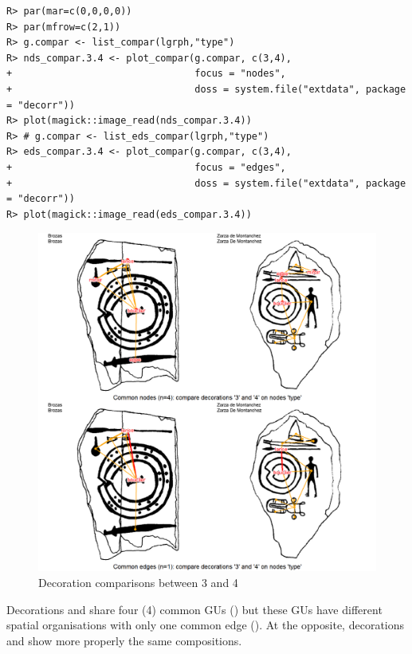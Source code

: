 \documentclass[article]{jss}\usepackage{knitr}
\begin{document}
\begin{kframe}
\begin{verbatim}
R> par(mar=c(0,0,0,0))
R> par(mfrow=c(2,1))
R> g.compar <- list_compar(lgrph,"type")
R> nds_compar.3.4 <- plot_compar(g.compar, c(3,4),
+                                focus = "nodes",
+                                doss = system.file("extdata", package = "decorr"))
R> plot(magick::image_read(nds_compar.3.4))
R> # g.compar <- list_eds_compar(lgrph,"type")
R> eds_compar.3.4 <- plot_compar(g.compar, c(3,4),
+                                focus = "edges",
+                                doss = system.file("extdata", package = "decorr"))
R> plot(magick::image_read(eds_compar.3.4))
\end{verbatim}
\end{kframe}\begin{figure}[H]

{\centering \includegraphics[width=\maxwidth]{figure/unnamed-chunk-11-1} 

}

\caption{\label{fig:figs}Decoration comparisons between 3 and 4}\label{fig:unnamed-chunk-11}
\end{figure}



Decorations  and  share four (4) common GUs () but  these GUs have different spatial organisations with only one common edge (). At the opposite, decorations  and  show more properly the same compositions.
\end{document}
